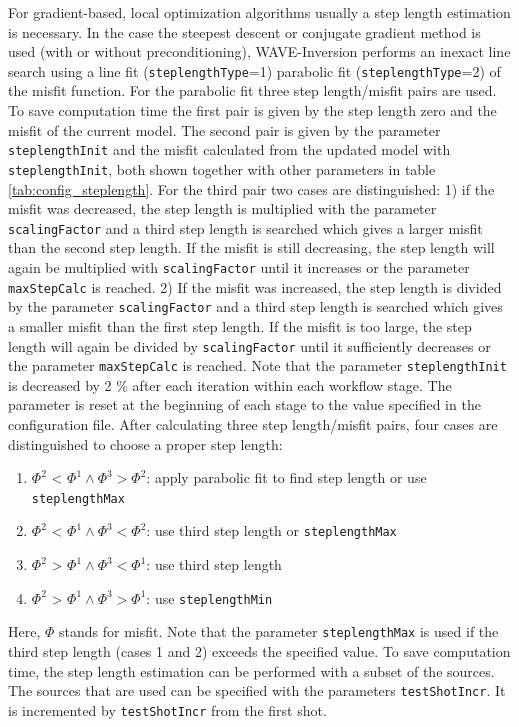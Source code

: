 \documentclass[pdftex,a4paper,parskip,listof=totoc,bibliography=totoc,onehalfspacing,12pt]{scrreprt}
\begin{document}
For gradient-based, local optimization algorithms usually a step length estimation is necessary. In the case the steepest descent or conjugate gradient method is used (with or without preconditioning), WAVE-Inversion performs an inexact line search using a line fit (\verb+steplengthType+=1) parabolic fit (\verb+steplengthType+=2) of the misfit function. For the parabolic fit three step length/misfit pairs are used. To save computation time the first pair is given by the step length zero and the misfit of the current model. The second pair is given by the parameter \verb+steplengthInit+ and the misfit calculated from the updated model with \verb+steplengthInit+, both shown together with other parameters in table \ref{tab:config_steplength}. For the third pair two cases are distinguished: 1) if the misfit was decreased, the step length is multiplied with the parameter \verb+scalingFactor+ and a third step length is searched which gives a larger misfit than the second step length. If the misfit is still decreasing, the step length will again be multiplied with \verb+scalingFactor+ until it increases or the parameter \verb+maxStepCalc+ is reached. 2) If the misfit was increased, the step length is divided by the parameter \verb+scalingFactor+ and a third step length is searched which gives a smaller misfit than the first step length. If the misfit is too large, the step length will again be divided by \verb+scalingFactor+ until it sufficiently decreases or the parameter \verb+maxStepCalc+ is reached.
Note that the parameter \verb+steplengthInit+ is decreased by 2 \% after each iteration within each workflow stage. The parameter is reset at the beginning of each stage to the value specified in the configuration file.
After calculating three step length/misfit pairs, four cases are distinguished to choose a proper step length:
\begin{enumerate}
 \item $\Phi^2$ < $\Phi^1 \land \Phi^3 > \Phi^2$: apply parabolic fit to find step length or use \verb+steplengthMax+ 
 \item $\Phi^2$ < $\Phi^1 \land \Phi^3 < \Phi^2$: use third step length or \verb+steplengthMax+
 \item $\Phi^2$ > $\Phi^1 \land \Phi^3 < \Phi^1$: use third step length 
 \item $\Phi^2$ > $\Phi^1 \land \Phi^3 > \Phi^1$: use \verb+steplengthMin+
\end{enumerate}

Here, $\Phi$ stands for misfit. Note that the parameter \verb+steplengthMax+ is used if the third step length (cases 1 and 2) exceeds the specified value.
To save computation time, the step length estimation can be performed with a subset of the sources. The sources that are used can be specified with the parameters \verb+testShotIncr+. It is incremented by \verb+testShotIncr+ from the first shot.
\end{document}
